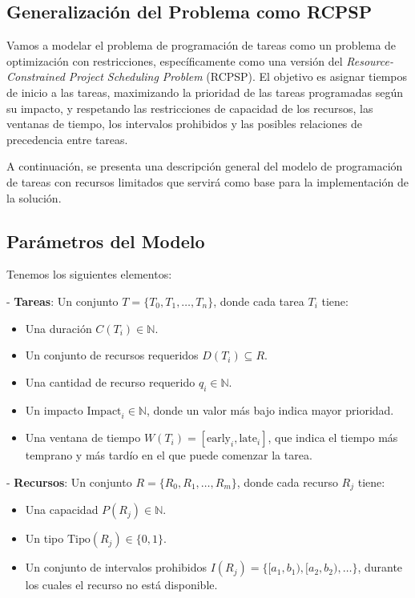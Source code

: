 \documentclass{article}
\begin{document}
\subsection{Generalización del Problema como RCPSP}

Vamos a modelar el problema de programación de tareas como un problema de optimización con restricciones, específicamente como una versión del \textit{Resource-Constrained Project Scheduling Problem} (RCPSP). El objetivo es asignar tiempos de inicio a las tareas, maximizando la prioridad de las tareas programadas según su impacto, y respetando las restricciones de capacidad de los recursos, las ventanas de tiempo, los intervalos prohibidos y las posibles relaciones de precedencia entre tareas.

A continuación, se presenta una descripción general del modelo de programación de tareas con recursos limitados que servirá como base para la implementación de la solución.

\subsection*{Parámetros del Modelo}

Tenemos los siguientes elementos:

- \textbf{Tareas}: Un conjunto \( T = \{T_0, T_1, \dots, T_n\} \), donde cada tarea \( T_i \) tiene:
  \begin{itemize}
    \item Una duración \( C(T_i) \in \mathbb{N} \).
    \item Un conjunto de recursos requeridos \( D(T_i) \subseteq R \).
    \item Una cantidad de recurso requerido \( q_i \in \mathbb{N} \).
    \item Un impacto \( \text{Impact}_i \in \mathbb{N} \), donde un valor más bajo indica mayor prioridad.
    \item Una ventana de tiempo \( W(T_i) = [\text{early}_i, \text{late}_i] \), que indica el tiempo más temprano y más tardío en el que puede comenzar la tarea.
  \end{itemize}

- \textbf{Recursos}: Un conjunto \( R = \{R_0, R_1, \dots, R_m\} \), donde cada recurso \( R_j \) tiene:
  \begin{itemize}
    \item Una capacidad \( P(R_j) \in \mathbb{N} \).
    \item Un tipo \( \text{Tipo}(R_j) \in \{0, 1\} \).
    \item Un conjunto de intervalos prohibidos \( I(R_j) = \{[a_1, b_1), [a_2, b_2), \dots\} \), durante los cuales el recurso no está disponible.
  \end{itemize}
\end{document}
